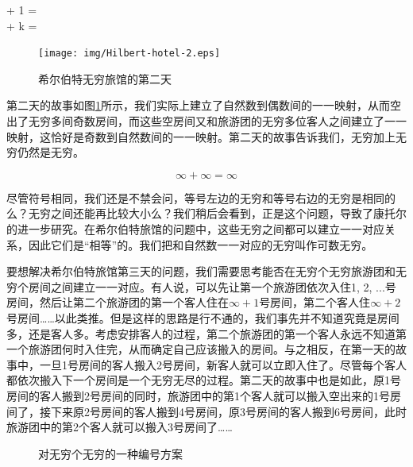 \documentclass{article}
\begin{document}
\bean
\infty + 1 = \infty \\
\infty + k = \infty \\
\eean

\begin{figure}[htbp]
 \centering
 \texttt{[image: img/Hilbert-hotel-2.eps]}
 \caption{希尔伯特无穷旅馆的第二天}
 \label{fig:Hilbert-hotel-2}
\end{figure}

第二天的故事如图\ref{fig:Hilbert-hotel-2}所示，我们实际上建立了自然数到偶数间的一一映射，从而空出了无穷多间奇数房间，而这些空房间又和旅游团的无穷多位客人之间建立了一一映射，这恰好是奇数到自然数间的一一映射。第二天的故事告诉我们，无穷加上无穷仍然是无穷。

\[
\infty + \infty = \infty
\]

尽管符号相同，我们还是不禁会问，等号左边的无穷和等号右边的无穷是相同的么？无穷之间还能再比较大小么？我们稍后会看到，正是这个问题，导致了康托尔的进一步研究。在希尔伯特旅馆的问题中，这些无穷之间都可以建立一一对应关系，因此它们是“相等”的。我们把和自然数一一对应的无穷叫作可数无穷。

要想解决希尔伯特旅馆第三天的问题，我们需要思考能否在无穷个无穷旅游团和无穷个房间之间建立一一对应。有人说，可以先让第一个旅游团依次入住1, 2, ...号房间，然后让第二个旅游团的第一个客人住在$\infty + 1$号房间，第二个客人住$\infty + 2$号房间……以此类推。但是这样的思路是行不通的，我们事先并不知道究竟是房间多，还是客人多。考虑安排客人的过程，第二个旅游团的第一个客人永远不知道第一个旅游团何时入住完，从而确定自己应该搬入的房间。与之相反，在第一天的故事中，一旦1号房间的客人搬入2号房间，新客人就可以立即入住了。尽管每个客人都依次搬入下一个房间是一个无穷无尽的过程。第二天的故事中也是如此，原1号房间的客人搬到2号房间的同时，旅游团中的第1个客人就可以搬入空出来的1号房间了，接下来原2号房间的客人搬到4号房间，原3号房间的客人搬到6号房间，此时旅游团中的第2个客人就可以搬入3号房间了……

\begin{figure}[htbp]
\centering
{}
\caption{对无穷个无穷的一种编号方案}
\label{fig:NNtoN}
\end{figure}
\end{document}

